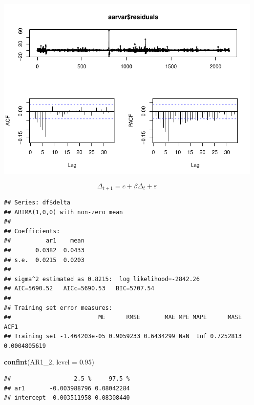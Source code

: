 \documentclass[11pt, a4paper]{report}
\newenvironment{Shaded}{\begin{snugshade}}{\end{snugshade}}
\newcommand{\DataTypeTok}[1]{\textcolor[rgb]{0.13,0.29,0.53}{#1}}
\newcommand{\DecValTok}[1]{\textcolor[rgb]{0.00,0.00,0.81}{#1}}
\newcommand{\FloatTok}[1]{\textcolor[rgb]{0.00,0.00,0.81}{#1}}
\newcommand{\KeywordTok}[1]{\textcolor[rgb]{0.13,0.29,0.53}{\textbf{#1}}}
\newcommand{\NormalTok}[1]{#1}
\newcommand{\OperatorTok}[1]{\textcolor[rgb]{0.81,0.36,0.00}{\textbf{#1}}}
\newcommand{\StringTok}[1]{\textcolor[rgb]{0.31,0.60,0.02}{#1}}
\theoremstyle{plain}
\theoremstyle{plain}
\theoremstyle{remark}
\begin{document}
\begin{center}\includegraphics{Econo2_P1_files/figure-latex/auto arima-12} \end{center}

\[ \Delta_{t+1} = c + \beta \Delta_t + \varepsilon\]

\begin{Shaded}
\end{Shaded}

\begin{verbatim}
## Series: df$delta 
## ARIMA(1,0,0) with non-zero mean 
## 
## Coefficients:
##          ar1    mean
##       0.0382  0.0433
## s.e.  0.0215  0.0203
## 
## sigma^2 estimated as 0.8215:  log likelihood=-2842.26
## AIC=5690.52   AICc=5690.53   BIC=5707.54
## 
## Training set error measures:
##                         ME      RMSE       MAE MPE MAPE      MASE         ACF1
## Training set -1.464203e-05 0.9059233 0.6434299 NaN  Inf 0.7252813 0.0004805619
\end{verbatim}

\begin{Shaded}
\begin{Highlighting}[]
\KeywordTok{confint}\NormalTok{(AR1_}\DecValTok{2}\NormalTok{, }\DataTypeTok{level =} \FloatTok{0.95}\NormalTok{)}
\end{Highlighting}
\end{Shaded}

\begin{verbatim}
##                  2.5 %     97.5 %
## ar1       -0.003988796 0.08042284
## intercept  0.003511958 0.08308440
\end{verbatim}
\end{document}
